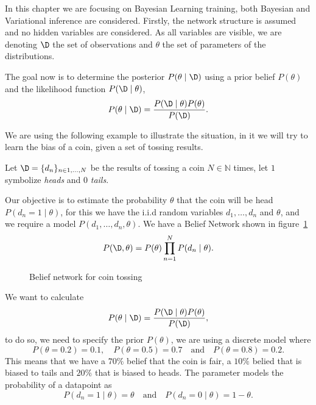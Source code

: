 
In this chapter we are focusing on Bayesian Learning training, both Bayesian and Variational inference are considered. Firstly, the network structure is assumed and no hidden variables are considered. As all variables are visible, we are denoting \(\D\) the set of observations and \(\theta\) the set of parameters of the distributions.

The goal now is to determine the posterior \(P(\theta \mid \D)\) using a prior belief \(P(\theta)\) and the likelihood function \(P(\D \mid \theta)\),
\[
  P(\theta \mid  \D) = \frac{P(\D  \mid  \theta)P(\theta)}{P(\D)}.
\]

We are using the following example to illustrate the situation, in it we will try to learn the bias of a coin, given a set of tossing results.

\begin{exampleth}\label{ex:coin_toss}
  Let \(\D = \{d_n\}_{n \in 1,\dots,N}\) be the results of tossing a coin \(N \in
  \mathbb{N}\) times, let \(1\) symbolize \emph{heads} and \(0\) \emph{tails}.

  Our objective is to estimate the probability \(\theta\) that the coin will be
  head \(P(d_n = 1  \mid  \theta)\), for this we have the i.i.d random variables \(d_1,\dots,d_n\)
  and \(\theta\), and we require a model \(P(d_1,\dots,d_n,\theta)\). We have a
  Belief Network shown in figure~\ref{fig:learning_coin}
  \[
    P(\D,\theta) = P(\theta)\prod_{n=1}^N P(d_n \mid \theta).
  \]

\begin{figure}[h!]
\centering
{}
\caption{Belief network for coin tossing}
\label{fig:learning_coin}
\end{figure}

We want to calculate
\[
  P(\theta \mid \D) = \frac{P(\D \mid \theta)P(\theta)}{P(\D)},
\]
to do so, we need to specify the prior \(P(\theta)\), we are using a discrete
model where
\[
  P(\theta = 0.2) = 0.1, \quad P(\theta = 0.5) = 0.7 \quad \text{and} \quad P(\theta = 0.8) = 0.2.
\]
This means that we have a \(70\%\) belief that the coin is fair, a \(10\%\)
belied that is biased to tails and \(20\%\) that is biased to heads.
The parameter models the probability of a datapoint as
\[
  P(d_n = 1 \mid \theta) = \theta \quad \text{and} \quad P(d_n = 0 \mid \theta) = 1 - \theta .
  \] 


\end{exampleth}

